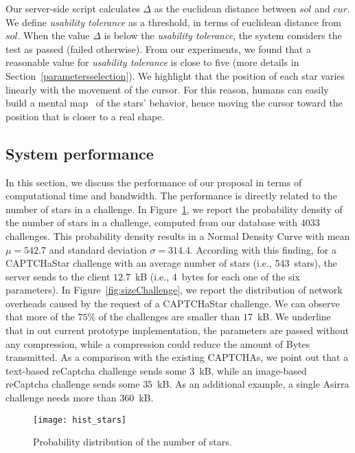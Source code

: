 \documentclass[conference]{IEEEtran}
\newcommand{\hilight}[1]{#1}
\begin{document}
Our server-side script calculates $\Delta$ as the euclidean distance between $sol$ and $cur$.
We define \textit{usability tolerance} as a threshold, in terms of euclidean distance from $sol$. 
When the value $\Delta$ is below the \textit{usability tolerance}, the system considers the test as passed (failed otherwise).  
From our experiments, we found that a reasonable value for \textit{usability tolerance} is close to five \hilight{(more details in Section}~\ref{parametersselection}). We highlight that the position of each star varies linearly with the movement of the cursor.
For this reason, humans can easily build a mental map~\cite{norman2013design} of the stars' behavior, hence moving the cursor toward the position that is closer to a real shape.


\subsection{System performance}
\hilight{In this section, we discuss the performance of our proposal in terms of computational time and bandwidth.
The performance is directly related to the number of stars in a challenge.}
In Figure~\ref{fig:histGeneration}, \hilight{we report the probability density of the number of stars in a challenge, computed from our database with $4033$ challenges.
This probability density results in a Normal Density Curve with mean $\mu = 542.7$ and standard deviation $\sigma = 314.4$.}
According with this finding, for a CAPTCHaStar challenge with an average number of stars (i.e., 543~stars), the server sends to the client $12.7$~kB (i.e., 4~bytes for each one of the six parameters).
In Figure~\ref{fig:sizeChallenge}, we report the distribution of network overheads caused by the request of a CAPTCHaStar challenge. 
We can observe that more of the $75\%$ of the challenges are smaller than $17$~kB.
\hilight{We underline that in out current prototype implementation, the parameters are passed without any compression, while a compression could reduce the amount of Bytes transmitted.
As a comparison with the existing CAPTCHAs, we point out that a text-based reCaptcha challenge sends some $3$~kB, while an image-based reCaptcha challenge sends some $35$~kB. 
As an additional example, a single Asirra challenge needs more than $360$~kB.}

\begin{figure}[ht]\centering
\texttt{[image: hist\_stars]}
\caption{Probability distribution of the number of stars.}
\label{fig:histGeneration}
\end{figure}
\end{document}
